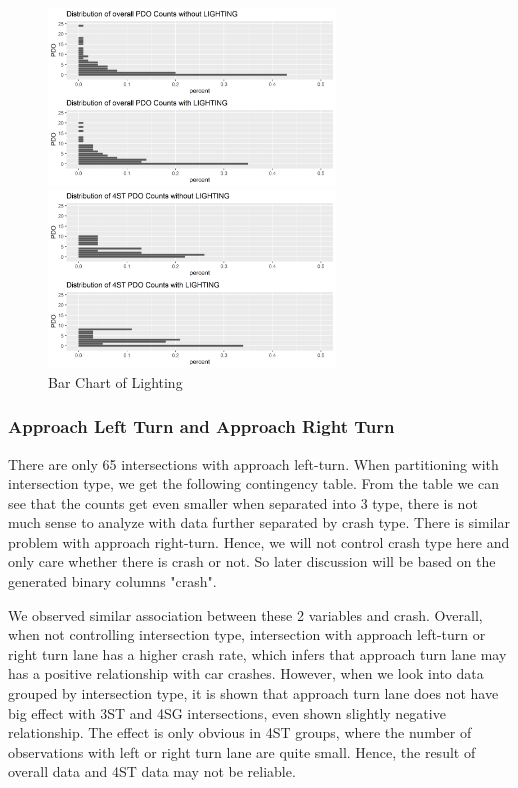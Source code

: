 \documentclass[11pt]{scrartcl} %
\begin{document}
\begin{figure}[H]
\begin{minipage}[t]{0.5\linewidth}
\centering
\includegraphics[width=3in]{image/LIGHTING_all_PDO.png}
\small
\end{minipage}
\begin{minipage}[t]{0.5\linewidth}
\centering
\includegraphics[width=3in]{image/LIGHTING_4ST_PDO.png}
\small
\end{minipage}
\caption{Bar Chart of Lighting}
\end{figure}

\subsubsection{Approach Left Turn and Approach Right Turn}

There are only 65 intersections with approach left-turn. When partitioning with intersection type, we get the following contingency table. From the table we can see that the counts get even smaller when separated into 3 type, there is not much sense to analyze with data further separated by crash type. There is similar problem with approach right-turn. Hence, we will not control crash type here and only care whether there is crash or not. So later discussion will be based on the generated binary columns "crash".

We observed similar association between these 2 variables and crash. Overall, when not controlling intersection type, intersection with approach left-turn or right turn lane has a higher crash rate, which infers that approach turn lane may has a positive relationship with car crashes. However, when we look into data grouped by intersection type, it is  shown that approach turn lane does not have big effect with 3ST and 4SG intersections, even shown slightly negative relationship. The effect is only obvious in 4ST groups, where the number of observations with left or right turn lane are quite small. Hence, the result of overall data and 4ST data may not be reliable.
\end{document}
